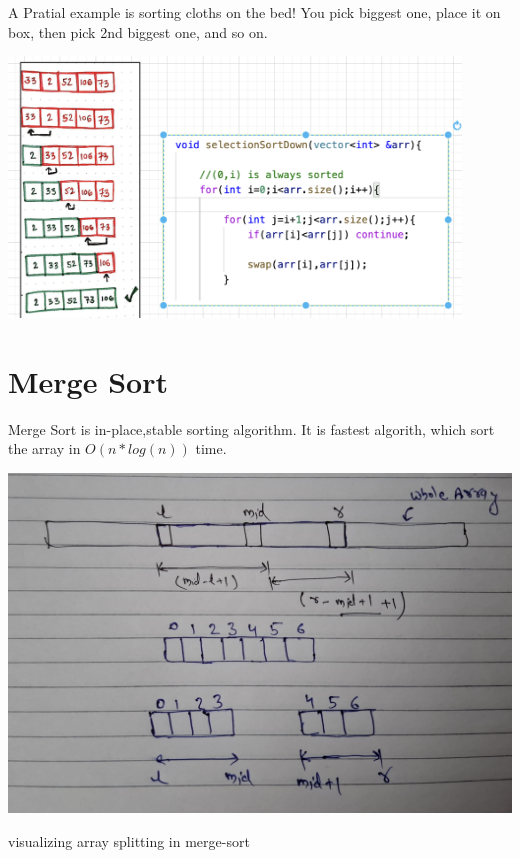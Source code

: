  A Pratial example is sorting cloths on the bed! You pick biggest one, place it on box, then pick 2nd biggest one, and so on.
 
 \includegraphics[width=12cm]{resources/sorting-selection-sort.png}

 \section{Merge Sort}
 Merge Sort is in-place,stable sorting algorithm. It is fastest algorith, which sort the array in $O(n*log(n))$ time.

 \begin{marginfigure}
    


     \includegraphics[width=\marginparwidth]{resources/sorting-merge-sort-division.jpg}
     \caption{visualizing array splitting in merge-sort}

 \end{marginfigure}

